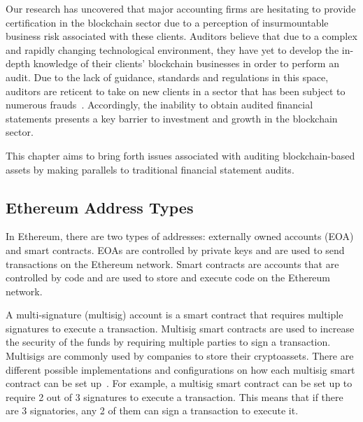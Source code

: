 Our research has uncovered that major accounting firms are hesitating to provide certification in the blockchain sector due to a perception of insurmountable business risk associated with these clients. Auditors believe that due to a complex and rapidly changing technological environment, they have yet to develop the in-depth knowledge of their clients' blockchain businesses in order to perform an audit. Due to the lack of guidance, standards and regulations in this space, auditors are reticent to take on new clients in a sector that has been subject to numerous frauds~\cite{abreu2018blockchain}. Accordingly, the inability to obtain audited financial statements presents a key barrier to investment and growth in the blockchain sector.


This chapter aims to bring forth issues associated with auditing blockchain-based assets by making parallels to traditional financial statement audits. 




\subsection{Ethereum Address Types}
In Ethereum, there are two types of addresses: externally owned accounts (EOA) and smart contracts. EOAs are controlled by private keys and are used to send transactions on the Ethereum network. Smart contracts are accounts that are controlled by code and are used to store and execute code on the Ethereum network. 



A multi-signature (multisig) account is a smart contract that requires multiple signatures to execute a transaction. Multisig smart contracts are used to increase the security of the funds by requiring multiple parties to sign a transaction. Multisigs are commonly used by companies to store their cryptoassets. There are different possible implementations and configurations on how each multisig smart contract can be set up~\cite{ittay2021wallet}. For example, a multisig smart contract can be set up to require 2 out of 3 signatures to execute a transaction. This means that if there are 3 signatories, any 2 of them can sign a transaction to execute it.

